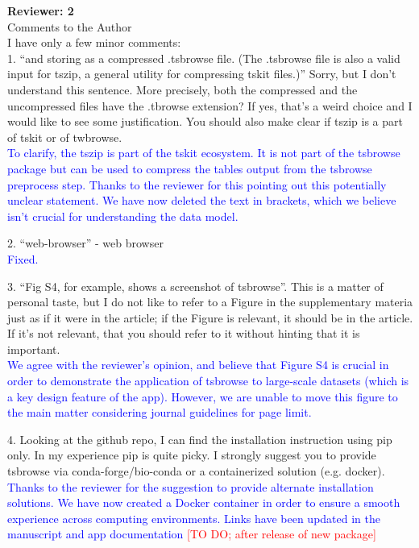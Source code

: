 \documentclass{article}
\begin{document}
\textbf{Reviewer: 2}\\

Comments to the Author\\

I have only a few minor comments:\\
1. ``and storing as a compressed .tsbrowse file. (The .tsbrowse file is also a valid input for
tszip, a general utility for compressing tskit files.)'' Sorry, but I don't understand this sentence. 
More precisely, both the compressed and the uncompressed files have the .tbrowse extension? If yes, 
that's a weird choice and I would like to see some justification. You should also make clear if tszip 
is a part of tskit or of twbrowse.\\
\textcolor{blue}{To clarify, the tszip is part of the tskit ecosystem. It is not part of the tsbrowse 
package but can be used to compress the tables output from the tsbrowse preprocess step. Thanks to 
the reviewer for this pointing out this potentially unclear statement. We have now deleted the text 
in brackets, which we believe isn't crucial for understanding the data model.}

2. ``web-browser'' - web browser\\
\textcolor{blue}{Fixed.}

3. ``Fig S4, for example, shows a screenshot of tsbrowse''. This is a matter of personal taste, but I do
not like to refer to a Figure in the supplementary materia just as if it were in the article; if the 
Figure is relevant, it should be in the article. If it's not relevant, that you should refer to it without
hinting that it is important.\\
\textcolor{blue}{We agree with the reviewer's opinion, and believe that Figure S4 is crucial 
in order to demonstrate the application of tsbrowse to large-scale datasets (which is a key design 
feature of the app). However, we are unable to move this figure to the main matter considering journal 
guidelines for page limit.}

4. Looking at the github repo, I can find the installation instruction using pip only. In my experience 
pip is quite picky. I strongly suggest you to provide tsbrowse via conda-forge/bio-conda or a containerized 
solution (e.g. docker).\\
\textcolor{blue}{Thanks to the reviewer for the suggestion to provide alternate installation solutions. 
We have now created a Docker container in order to ensure a smooth experience across computing environments. 
Links have been updated in the manuscript and app documentation}
\textcolor{red}{[TO DO; after release of new package]}
\end{document}
